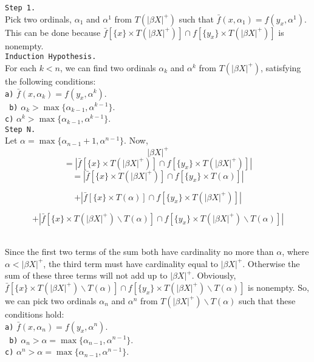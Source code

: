 \documentclass{article}
\begin{document}
\texttt{Step 1.}\\ Pick two ordinals, $\alpha_1$ and $ \alpha^1$ from $T(|\beta X|^+)$ such that $\bar{f}(x,\alpha_1)=f(y_x, \alpha^1)$. This can be done because $\bar{f}[\{x\}\times T(|\beta X|^+)] \cap f[\{y_x\} \times T(|\beta X |^+)]$ is nonempty.\\

\texttt{Induction Hypothesis.}\\ For each $k<n$, we can find two ordinals $\alpha_k$ and $\alpha^k$ from $T(|\beta X|^+)$,  satisfying the following conditions: \\
	\texttt{a)} $\bar{f}(x,\alpha_k)=f(y_x,\alpha^k)$.	\\	
\texttt{	b)} $\alpha_k> \max\{\alpha_{k-1}, \alpha^{k-1}\}$.\\	
	\texttt{c)} $\alpha^k> \max\{\alpha_{k-1}, \alpha^{k-1}\}$.\\


\texttt{Step N.}\\ Let $\alpha=\max\{\alpha_{n-1}+1,\alpha^{n-1}\}.$ Now,  \vskip 10pt    
$$|\beta X|^+ $$
    $$= \left| \bar{f}\left[\{x\}\times T(|\beta X|^+)\right] \cap f\left[\{y_x\} \times T(|\beta X |^+)\right]\right|$$
    $$=\left| \bar{f}\left[\{x\}\times T(|\beta X|^+)\right] \cap f\left[\{y_x\} \times T(\alpha)\right]\right|$$
    
    $$+\left| \bar{f}\left[\{x\}\times T(\alpha)\right] \cap f\left[\{y_x\} \times T(|\beta X |^+)\right]\right|$$
    
    $$+\left| \bar{f}\left[\{x\}\times T(|\beta X|^+)\backslash T(\alpha)\right] \cap f\left[\{y_x\} \times T(|\beta X |^+)\backslash T(\alpha)\right]\right|$$\\

\vskip 10pt

Since the first two terms of the sum both have cardinality no more than $\alpha$, where $\alpha <|\beta X|^+$, the third term must have cardinality equal to $|\beta X|^+$. Otherwise the sum of these three terms will not add up to $|\beta X|^+$. Obviously, $\bar{f}[\{x\}\times T(|\beta X|^+)\backslash T(\alpha)] \cap f[\{y_x\} \times T(|\beta X |^+)\backslash T(\alpha)] $ is nonempty. So, we can pick two ordinals $\alpha_n$ and $\alpha^n$ from $T(|\beta X|^+)\backslash T(\alpha)$ such that these conditions hold: \\
	\texttt{a)} $\bar{f}(x,\alpha_n)=f(y_x,\alpha^n)$.	\\	
\texttt{	b)} $\alpha_n> \alpha= \max\{\alpha_{n-1}, \alpha^{n-1}\}$.\\	
	\texttt{c)} $\alpha^n> \alpha= \max\{\alpha_{n-1}, \alpha^{n-1}\}$.\\
	
\end{document}

